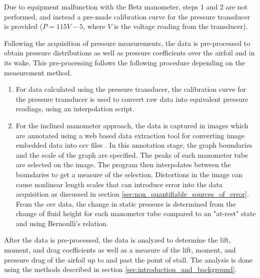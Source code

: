 \documentclass[runningheads]{llncs}
\begin{document}
\noindent
Due to equipment malfunction with the Betz manometer, steps 1 and 2 are not performed, and instead a pre-made calibration curve for the pressure transducer is provided ($P = 115V - 5$, where $V$ is the voltage reading from the transducer).

\noindent
Following the acquisition of pressure measurements, the data is pre-processed to obtain pressure distributions as well as pressure coefficients over the airfoil and in its wake. This pre-processing follows the following procedure depending on the measurement method.

\begin{enumerate}

    \item For data calculated using the pressure transducer, the calibration curve for the pressure transducer is used to convert raw data into equivalent pressure readings, using an interpolation script.

    \item For the inclined manometer approach, the data is captured in images which are annotated using a web based data extraction tool for converting image embedded data into csv files \cite{Rohatgi2020}. In this annotation stage, the graph boundaries and the scale of the graph are specified. The peaks of each manometer tube are selected on the image. The program then interpolates between the boundaries to get a measure of the selection. Distortions in the image can cause nonlinear length scales that can introduce error into the data acquisition as discussed in section \ref{sec:non_quantifiable_sources_of_error}. From the csv data, the change in static pressure is determined from the change of fluid height for each manometer tube compared to an "at-rest" state and using Bernoulli's relation.

\end{enumerate}

\noindent
After the data is pre-processed, the data is analyzed to determine the lift, moment, and drag coefficients as well as a measure of the lift, moment, and pressure drag of the airfoil up to and past the point of stall. The analysis is done using the methods described in section \ref{sec:introduction_and_background}.\newline


\end{document}
